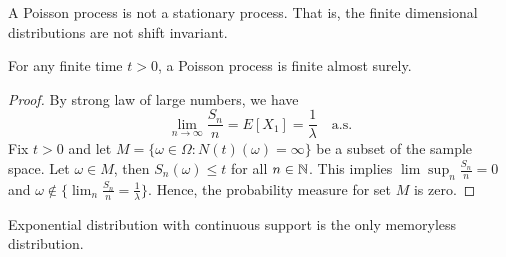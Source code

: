 \documentclass[a4paper,10pt,english]{article}
\begin{document}
\begin{rem} A Poisson process is not a stationary process. That is, the finite dimensional distributions are not shift invariant. 
\end{rem}
\begin{lem} For any finite time $t > 0$, a Poisson process is finite almost surely.
\end{lem}
\begin{proof} By strong law of large numbers, we have 
\begin{equation*}
\lim_{n \to \infty} \frac{S_{n}}{n} = E[X_{1}] = \frac{1}{\lambda}\quad\mathrm{a.s.} 
\end{equation*}
Fix $t > 0$ and let $M = \{\omega \in \Omega: N(t)(\omega) = \infty \}$ be a subset of the sample space. Let $\omega \in M$, then $S_{n}(\omega)\leqslant t$ for all $n \in \mathbb{N}$. This implies $\lim\sup_n\frac{S_{n}}{n} = 0$  and $\omega \not\in \{\lim_n \frac{S_{n}}{n} = \frac{1}{\lambda} \}.$ Hence, the probability measure for set $M$ is zero. 
\end{proof}

\begin{prop} Exponential distribution with continuous support is the only memoryless distribution.%
\end{prop}
\end{document}
